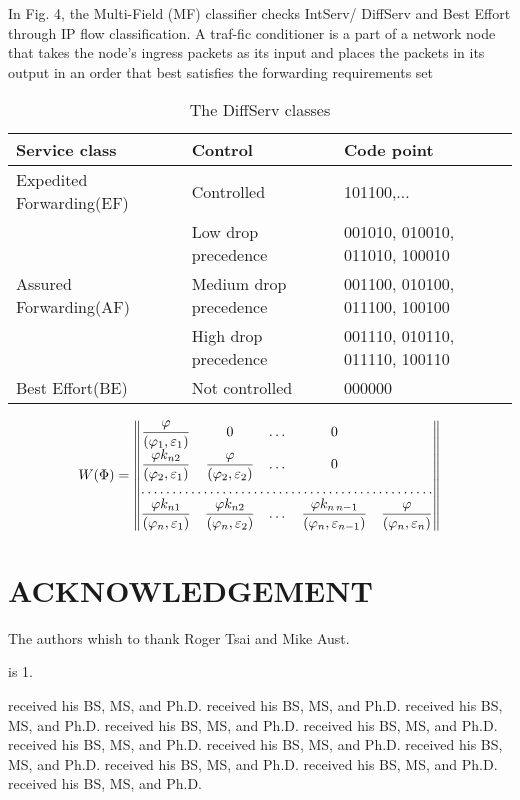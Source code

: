 \documentclass[10pt, twocolumn, twoside]{etri}
\begin{document}
In Fig. 4, the Multi-Field (MF) classifier checks IntServ/ DiffServ
and Best Effort through IP flow classification. A traf-fic conditioner
is a part of a network node that takes the node's ingress packets as
its input and places the packets in its output in an order that best
satisfies the forwarding requirements set

\begin{table}
\caption{The DiffServ classes}
\begin{tabular}{|p{3cm}|p{2cm}|p{2cm}|}\hline
Service class&	Control&	Code point\\\hline
Expedited Forwarding(EF)&	Controlled&	101100,...\\\hline
\multirow{3}{3cm}{Assured Forwarding(AF)}
&	Low drop precedence&	001010, 010010, 011010, 100010\\\cline{2-3}
&	Medium drop precedence&	001100, 010100, 011100, 100100\\\cline{2-3}
&	High drop precedence&	001110, 010110, 011110, 100110\\\hline
Best Effort(BE)&	Not controlled&	000000\\\hline
\end{tabular}
\end{table}

\small
\[ W(\Phi)= \begin{Vmatrix}
 \dfrac\varphi{(\varphi_1,\varepsilon_1)}&0&\dots&0\\
 \dfrac{\varphi k_{n2}}{(\varphi_2,\varepsilon_1)}&
 \dfrac\varphi{(\varphi_2,\varepsilon_2)}&\dots&0\\
 \hdotsfor{5}\\
 \dfrac{\varphi k_{n1}}{(\varphi_n,\varepsilon_1)}&
 \dfrac{\varphi k_{n2}}{(\varphi_n,\varepsilon_2)}&\dots&
 \dfrac{\varphi k_{n\,n-1}}{(\varphi_n,\varepsilon_{n-1})}&
 \dfrac{\varphi}{(\varphi_n,\varepsilon_n)}
\end{Vmatrix}\]
\normalsize

\section*{ACKNOWLEDGEMENT}

The authors whish to thank Roger Tsai and Mike Aust.

\begin{thebibliography}{}
 is 1.
\end{thebibliography}

\vskip5cm
received his BS, MS, and Ph.D.
received his BS, MS, and Ph.D.
received his BS, MS, and Ph.D.
received his BS, MS, and Ph.D.
received his BS, MS, and Ph.D.
received his BS, MS, and Ph.D.
received his BS, MS, and Ph.D.
received his BS, MS, and Ph.D.
received his BS, MS, and Ph.D.
received his BS, MS, and Ph.D.
received his BS, MS, and Ph.D.
\end{document}
